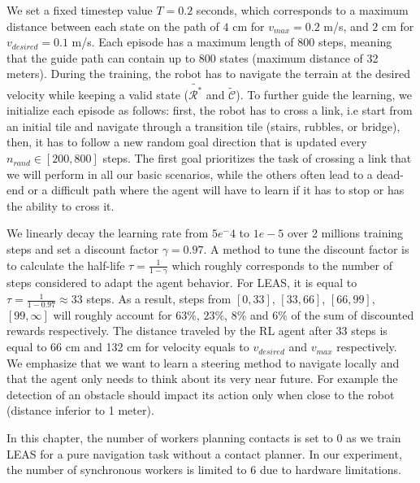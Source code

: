 We set a fixed timestep value $T =0.2$ seconds, which corresponds to a maximum distance between each state on the path of $4$ cm for $v_{max}=0.2$ m/s, and $2$ cm for $v_{desired}=0.1$ m/s.
Each episode has a maximum length of $800$ steps, meaning that the guide path can contain up to $800$ states (maximum distance of 32 meters). 
During the training, the robot has to navigate the terrain at the desired velocity while keeping a valid state ($\tilde{\mathcal{R}^*}$ and $\tilde{\mathcal{C}}$).
To further guide the learning, we initialize each episode as follows: first, the robot has to cross a link, i.e start from an initial tile and navigate through a transition tile (stairs, rubbles, or bridge), then, it has to follow a new random goal direction that is updated every $n_{rand} \in [200,800]$ steps.
The first goal prioritizes the task of crossing a link that we will perform in all our basic scenarios, while the others often lead to a dead-end or a difficult path where the agent will have to learn if it has to stop or has the ability to cross it.

We linearly decay the learning rate from $5e^-4$ to $1e-5$ over 2 millions training steps and set a discount factor $\gamma = 0.97$. 
A method to tune the discount factor is to calculate the half-life $\tau = \frac{1}{1-\gamma}$ which roughly corresponds to the number of steps considered to adapt the agent behavior. For LEAS, it is equal to $\tau = \frac{1}{1-0.97} \approx 33$ steps. 
As a result, steps from $[0,33]$, $[33,66]$, $[66,99]$, $[99,\infty]$ will roughly account for $63\%$, $23\%$, $8\%$ and $6\%$ of the sum of discounted rewards respectively. 
The distance traveled by the RL agent after 33 steps is equal to 66 cm and 132 cm for velocity equals to $v_{desired}$ and $v_{max}$ respectively.
We emphasize that we want to learn a steering method to navigate locally and that the agent only needs to think about its very near future. For example the detection of an obstacle should impact its action only when close to the robot (distance inferior to 1 meter).

In this chapter, the number of workers planning contacts is set to 0 as we train LEAS for a pure navigation task without a contact planner. In our experiment, the number of synchronous workers is limited to 6 due to hardware limitations.


